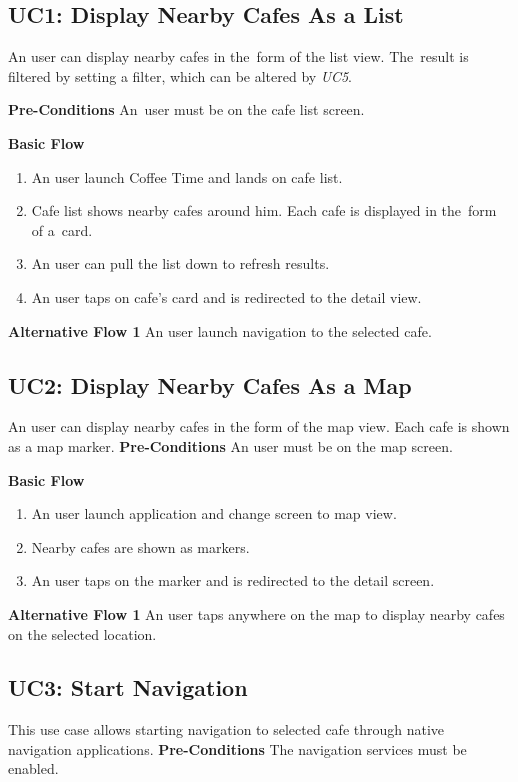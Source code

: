 \subsection{UC1: Display Nearby Cafes As a List}
An user can display nearby cafes in the~form of the list view. The~result is filtered by setting a filter, which can be altered by \textit{UC5}.

\newpara
\noindent \textbf{Pre-Conditions} An~user must be on the cafe list screen.

\newpara
\noindent \textbf{Basic Flow}

\begin{enumerate}
    \item An user launch Coffee Time and lands on cafe list.
    \item Cafe list shows nearby cafes around him. Each cafe is displayed in the~form of a~card.
    \item An user can pull the list down to refresh results. 
    \item An user taps on cafe's card and is redirected to the detail view.
\end{enumerate}

\noindent \textbf{Alternative Flow 1} An user launch navigation to the selected cafe.


\subsection{UC2: Display Nearby Cafes As a Map}
An user can display nearby cafes in the form of the map view. Each cafe is shown as a map marker.
\newpara
\noindent  \textbf{Pre-Conditions} An user must be on the map screen.

\newpara
\noindent \textbf{Basic Flow}

\begin{enumerate}
    \item An user launch application and change screen to map view. 
    \item Nearby cafes are shown as markers.
    \item An user taps on the marker and is redirected to the detail screen.
\end{enumerate}

\noindent  \textbf{Alternative Flow 1} An user taps anywhere on the map to display nearby cafes on the selected location.


\subsection{UC3: Start Navigation}
This use case allows starting navigation to selected cafe through native navigation applications.
\newpara
\noindent \textbf{Pre-Conditions} The navigation services must be enabled.

